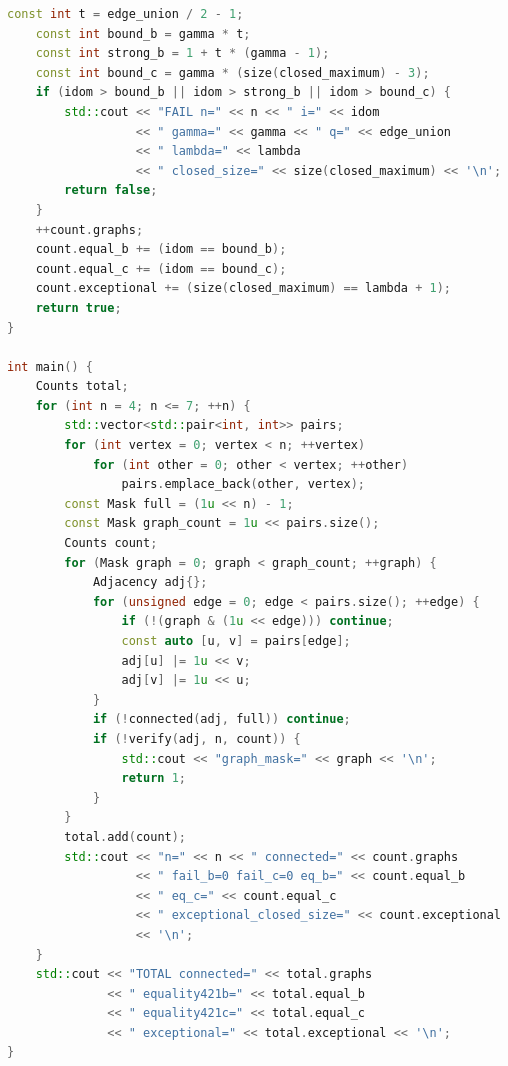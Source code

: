 \documentclass[11pt,a4paper]{article}
\theoremstyle{remark}
\begin{document}
\begin{lstlisting}[language=C++]
    const int t = edge_union / 2 - 1;
    const int bound_b = gamma * t;
    const int strong_b = 1 + t * (gamma - 1);
    const int bound_c = gamma * (size(closed_maximum) - 3);
    if (idom > bound_b || idom > strong_b || idom > bound_c) {
        std::cout << "FAIL n=" << n << " i=" << idom
                  << " gamma=" << gamma << " q=" << edge_union
                  << " lambda=" << lambda
                  << " closed_size=" << size(closed_maximum) << '\n';
        return false;
    }
    ++count.graphs;
    count.equal_b += (idom == bound_b);
    count.equal_c += (idom == bound_c);
    count.exceptional += (size(closed_maximum) == lambda + 1);
    return true;
}

int main() {
    Counts total;
    for (int n = 4; n <= 7; ++n) {
        std::vector<std::pair<int, int>> pairs;
        for (int vertex = 0; vertex < n; ++vertex)
            for (int other = 0; other < vertex; ++other)
                pairs.emplace_back(other, vertex);
        const Mask full = (1u << n) - 1;
        const Mask graph_count = 1u << pairs.size();
        Counts count;
        for (Mask graph = 0; graph < graph_count; ++graph) {
            Adjacency adj{};
            for (unsigned edge = 0; edge < pairs.size(); ++edge) {
                if (!(graph & (1u << edge))) continue;
                const auto [u, v] = pairs[edge];
                adj[u] |= 1u << v;
                adj[v] |= 1u << u;
            }
            if (!connected(adj, full)) continue;
            if (!verify(adj, n, count)) {
                std::cout << "graph_mask=" << graph << '\n';
                return 1;
            }
        }
        total.add(count);
        std::cout << "n=" << n << " connected=" << count.graphs
                  << " fail_b=0 fail_c=0 eq_b=" << count.equal_b
                  << " eq_c=" << count.equal_c
                  << " exceptional_closed_size=" << count.exceptional
                  << '\n';
    }
    std::cout << "TOTAL connected=" << total.graphs
              << " equality421b=" << total.equal_b
              << " equality421c=" << total.equal_c
              << " exceptional=" << total.exceptional << '\n';
}
\end{lstlisting}
\end{document}
